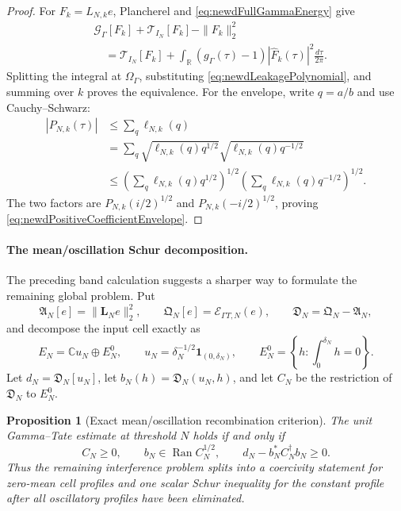 \documentclass[11pt]{amsart}
\newtheorem{proposition}[theorem]{Proposition}
\theoremstyle{definition}
\theoremstyle{remark}
\newcommand{\C}{\mathbb C}
\newcommand{\R}{\mathbb R}
\begin{document}
\begin{proof}
For $F_k=L_{N,k}e$, Plancherel and
\eqref{eq:newdFullGammaEnergy} give
\begin{align*}
 &\mathcal G_\Gamma[F_k]+\mathcal T_{I_N}[F_k]-\|F_k\|_2^2\\
 &\quad=\mathcal T_{I_N}[F_k]
 +\int_\R(g_\Gamma(\tau)-1)|\widehat F_k(\tau)|^2
          \frac{d\tau}{2\pi}.
\end{align*}
Splitting the integral at $\Omega_\Gamma$, substituting
\eqref{eq:newdLeakagePolynomial}, and summing over $k$ proves the
equivalence.  For the envelope, write $q=a/b$ and use Cauchy--Schwarz:
\begin{align*}
 |P_{N,k}(\tau)|
 &\leq\sum_q\ell_{N,k}(q)\\
 &=\sum_q
   \sqrt{\ell_{N,k}(q)q^{1/2}}
   \sqrt{\ell_{N,k}(q)q^{-1/2}}\\
 &\leq
 \left(\sum_q\ell_{N,k}(q)q^{1/2}\right)^{1/2}
 \left(\sum_q\ell_{N,k}(q)q^{-1/2}\right)^{1/2}.
\end{align*}
The two factors are $P_{N,k}(i/2)^{1/2}$ and
$P_{N,k}(-i/2)^{1/2}$, proving
\eqref{eq:newdPositiveCoefficientEnvelope}.
\end{proof}

\paragraph{The mean/oscillation Schur decomposition.}
The preceding band calculation suggests a sharper way to formulate the
remaining global problem.  Put
\[
 \mathfrak A_N[e]=\|\mathbf L_Ne\|_2^2,
 \qquad
 \mathfrak Q_N[e]=\mathcal E_{\Gamma T,N}(e),
 \qquad
 \mathfrak D_N=\mathfrak Q_N-\mathfrak A_N,
\]
and decompose the input cell exactly as
\begin{equation}\label{eq:newdMeanZeroSplit}
 E_N=\C u_N\oplus E_N^0,
 \qquad
 u_N=\delta_N^{-1/2}\mathbf1_{(0,\delta_N)},
 \qquad
 E_N^0=\left\{h:\int_0^{\delta_N}h=0\right\}.
\end{equation}
Let $d_N=\mathfrak D_N[u_N]$, let
$b_N(h)=\mathfrak D_N(u_N,h)$, and let $C_N$ be the restriction of
$\mathfrak D_N$ to $E_N^0$.

\begin{proposition}[Exact mean/oscillation recombination criterion]
\label{prop:newdMeanZeroSchur}
The unit Gamma--Tate estimate at threshold $N$ holds if and only if
\begin{equation}\label{eq:newdMeanZeroSchurCriterion}
 C_N\geq0,
 \qquad
 b_N\in\operatorname{Ran}C_N^{1/2},
 \qquad
 d_N-b_N^*C_N^\dagger b_N\geq0.
\end{equation}
Thus the remaining interference problem splits into a coercivity statement
for zero-mean cell profiles and one scalar Schur inequality for the constant
profile after all oscillatory profiles have been eliminated.
\end{proposition}
\end{document}
